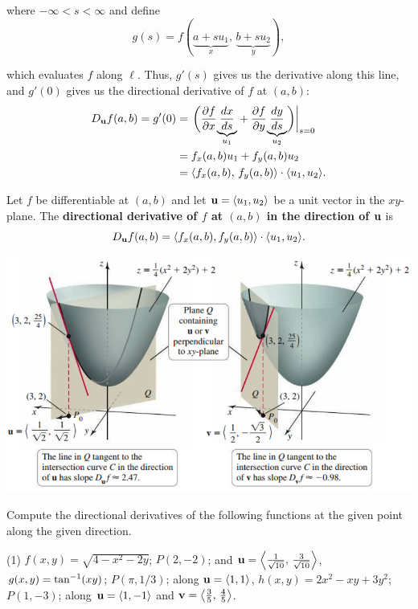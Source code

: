 \documentclass[mathNotesPreamble]{subfiles}
\begin{document}
  where $-\infty<s<\infty$ and define
    \[g(s)=f(\underbrace{a+su_1}_x,\,\underbrace{b+su_2}_y),\]

  which evaluates $f$ along $\ell$. Thus, $g'(s)$ gives us the derivative along this line, and $g'(0)$ gives us the directional derivative of $f$ at $(a,b)$:
  \begin{align*}
    D_{\mathbf{u}} f(a,b)=g'(0)&=\left.{\left(\frac{\partial f}{\partial x}\smash{\underbrace{\frac{dx}{ds}}_{u_1}}+\frac{\partial f}{\partial y}\smash{\underbrace{\frac{dy}{ds}}_{u_2}}\right)}\right|_{s=0}\\[0.75\baselineskip]
      &=f_x(a,b) u_1+f_y(a,b)u_2\\
      &={\left\langle f_x(a,b),\,f_y(a,b) \right\rangle}\cdot{\left\langle u_1,u_2 \right\rangle}.
  \end{align*}

  \begin{thmBox*}
    Let $f$ be differentiable at $(a,b)$ and let ${\mathbf{u}}={\left\langle u_1,u_2 \right\rangle}$ be a unit vector in the $xy$-plane. The \textbf{directional derivative of $f$ at $(a,b)$ in the direction of ${\mathbf{u}}$} is
      \[D_{\mathbf{u}} f(a,b)={\left\langle f_x(a,b), f_y(a,b) \right\rangle}\cdot{\left\langle u_1, u_2 \right\rangle}.\]
  \end{thmBox*}

  \begin{center}
    \includegraphics[width=0.525\linewidth]{images/briggs_15_05/fig15_48}
  \end{center}
  \pagebreak

  \begin{ex*}
    Compute the directional derivatives of the following functions at the given point along the given direction.
  \end{ex*}
  \begin{tasks}[after-item-skip=\stretch{1}, label=](1)
    \task $f(x,y)=\sqrt{4-x^2-2y}$; $P(2,-2)$; and ${\mathbf{u}}={\left\langle \frac{1}{\sqrt{10}},\,\frac{3}{\sqrt{10}} \right\rangle}$,
    \task $g(x,y)=\tan^{-1}(xy)$; $P(\pi,1/3)$; along ${\mathbf{u}}={\left\langle 1,1 \right\rangle}$,
    \task $h(x,y)=2x^2-xy+3y^2$; $P(1,-3)$; along ${\mathbf{u}}={\left\langle 1,-1 \right\rangle}$ and ${\mathbf{v}}={\left\langle \frac{3}{5},\,\frac{4}{5} \right\rangle}$.
  \end{tasks}
  \pagebreak
\end{document}
